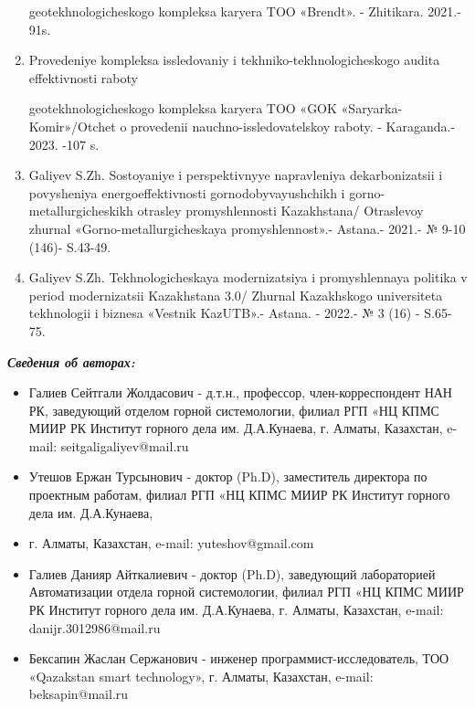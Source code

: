 \begin{enumerate}
geotekhnologicheskogo kompleksa karyera TOO «Brendt». - Zhitikara.
2021.- 91s.

\item
Provedeniye kompleksa issledovaniy i tekhniko-tekhnologicheskogo
audita effektivnosti raboty

geotekhnologicheskogo kompleksa karyera TOO
«GOK «Saryarka-Komіr»/Otchet o provedenii nauchno-issledovatelskoy
raboty. - Karaganda.- 2023. -107 s.

\item
Galiyev S.Zh. Sostoyaniye i perspektivnyye napravleniya
dekarbonizatsii i povysheniya energoeffektivnosti gornodobyvayushchikh i
gorno-metallurgicheskikh otrasley promyshlennosti Kazakhstana/
Otraslevoy zhurnal «Gorno-metallurgicheskaya promyshlennost».- Astana.-
2021.- № 9-10 (146)- S.43-49.

\item
Galiyev S.Zh. Tekhnologicheskaya modernizatsiya i promyshlennaya
politika v period modernizatsii Kazakhstana 3.0/ Zhurnal Kazakhskogo
universiteta tekhnologii i biznesa «Vestnik KazUTB».- Astana. - 2022.- №
3 (16) - S.65-75.
\end{enumerate}

\begin{center}
\emph{{\bfseries Сведения об авторах:}}
\end{center}

\begin{itemize}
\item
Галиев Сейтгали Жолдасович - д.т.н., профессор, член-корреспондент НАН
РК, заведующий отделом горной системологии, филиал РГП «НЦ КПМС МИИР РК
Институт горного дела им. Д.А.Кунаева, г. Алматы, Казахстан, e-mail:
seitgaligaliyev@mail.ru

\item
Утешов Ержан Турсынович - доктор (Ph.D), заместитель директора по
проектным работам, филиал РГП «НЦ КПМС МИИР РК Институт горного дела им.
Д.А.Кунаева,

\item
г. Алматы, Казахстан, e-mail:
yuteshov@gmail.com

\item
Галиев Данияр Айткалиевич - доктор (Ph.D), заведующий лабораторией
Автоматизации отдела горной системологии, филиал РГП «НЦ КПМС МИИР РК
Институт горного дела им. Д.А.Кунаева, г. Алматы, Казахстан, e-mail:
danijr.3012986@mail.ru

\item
Бексапин Жаслан Сержанович - инженер программист-исследователь, ТОО
«Qazakstan smart technology», г. Алматы, Казахстан, e-mail:
beksapin@mail.ru
\end{itemize}

